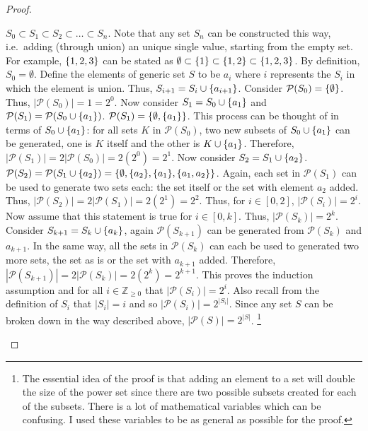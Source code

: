 \begin{proof}
\begin{itemize}
        \(S_0\subset S_1\subset S_2\subset\dots\subset S_n\). Note that any set \(S_n\) can be constructed this way, i.e.\ adding (through union) an unique single value, starting from 
        the empty set. For example, \(\{1,2,3\}\) can be stated as \(\emptyset\subset\{1\}\subset\{1,2\}\subset\{1,2,3\}\). By definition, \(S_0=\emptyset\). Define the elements
        of generic set \(S\) to be \(a_i\) where \(i\) represents the \(S_i\) in which the element is union. Thus, \(S_{i+1}=S_i\cup\{a_{i+1}\}\). Consider \(\mathcal{P}(S_0)=\{\emptyset\}\).
        Thus, \(|\mathcal{P}(S_0)|=1=2^0\). Now consider \(S_1=S_0\cup\{a_1\}\) and \(\mathcal{P}(S_1)=\mathcal{P}(S_0\cup\{a_1\})\). \(\mathcal{P}(S_1)=\{\emptyset,\{a_1\}\}\). This
        process can be thought of in terms of \(S_0\cup\{a_1\}\): for all sets \(K\) in \(\mathcal{P}(S_0)\), two new subsets of \(S_0\cup\{a_1\}\) can be generated, one is \(K\) itself and
        the other is \(K\cup\{a_1\}\). Therefore, \(|\mathcal{P}(S_1)|=2|\mathcal{P}(S_0)|=2(2^0)=2^1\). Now consider \(S_2=S_1\cup\{a_2\}\). 
        \(\mathcal{P}(S_2)=\mathcal{P}(S_1\cup\{a_2\})=\{\emptyset,\{a_2\},\{a_1\},\{a_1,a_2\}\}\). Again, each set in \(\mathcal{P}(S_1)\) can be used to generate two sets each: the set itself
        or the set with element \(a_2\) added. Thus, \(|\mathcal{P}(S_2)|=2|\mathcal{P}(S_1)|=2(2^1)=2^2\). Thus, for \(i\in[0,2]\), \(|\mathcal{P}(S_i)|=2^i\). Now assume that this statement is 
        true for \(i\in[0,k]\). Thus, \(|\mathcal{P}(S_k)|=2^k\). Consider \(S_{k+1}=S_k\cup\{a_k\}\), again \(\mathcal{P}(S_{k+1})\) can be generated from \(\mathcal{P}(S_k)\) and \(a_{k+1}\).
        In the same way, all the sets in \(\mathcal{P}(S_k)\) can each be used to generated two more sets, the set as is or the set with \(a_{k+1}\) added. Therefore, 
        \(|\mathcal{P}(S_{k+1})|=2|\mathcal{P}(S_k)|=2(2^k)=2^{k+1}\). This proves the induction assumption and for all \(i\in\mathbb{Z}_{\ge0}\) that \(|\mathcal{P}(S_i)|=2^i\). Also recall from
        the definition of \(S_i\) that \(|S_i|=i\) and so \(|\mathcal{P}(S_i)|=2^{|S_i|}\). Since any set \(S\) can be broken down in the way described above, \(|\mathcal{P}(S)|=2^{|S|}\).
        \footnote{The essential idea of the proof is that adding an element to a set will double the size of the power set since there are two possible subsets created for each of the subsets. There
        is a lot of mathematical variables which can be confusing. I used these variables to be as general as possible for the proof.}
    \end{itemize}
\end{proof}
